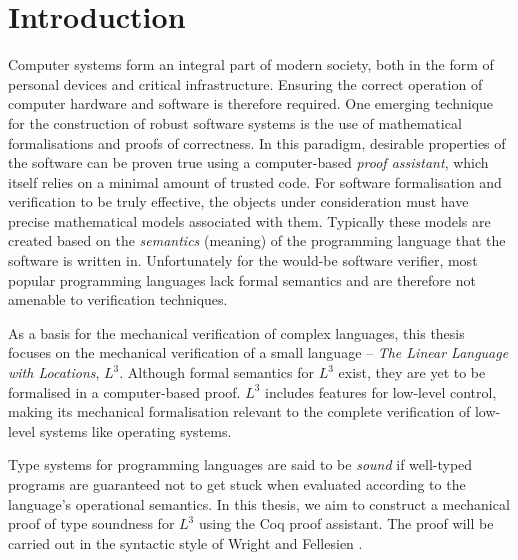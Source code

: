\documentclass[]{unswthesis}
\begin{document}
\frontmatter  
\maketitle

\tableofcontents

\mainmatter

\chapter{Introduction}
\label{ch:intro}

Computer systems form an integral part of modern society, both in the form of personal devices and critical infrastructure. Ensuring the correct operation of computer hardware and software is therefore required. One emerging technique for the construction of robust software systems is the use of mathematical formalisations and proofs of correctness. In this paradigm, desirable properties of the software can be proven true using a computer-based \textit{proof assistant}, which itself relies on a minimal amount of trusted code. For software formalisation and verification to be truly effective, the objects under consideration must have precise mathematical models associated with them. Typically these models are created based on the \textit{semantics} (meaning) of the programming language that the software is written in. Unfortunately for the would-be software verifier, most popular programming languages lack formal semantics and are therefore not amenable to verification techniques.

As a basis for the mechanical verification of complex languages, this thesis focuses on the mechanical verification of a small language -- \textit{The Linear Language with Locations}, $L^3$. Although formal semantics for $L^3$ exist, they are yet to be formalised in a computer-based proof. $L^3$ includes features for low-level control, making its mechanical formalisation relevant to the complete verification of low-level systems like operating systems.

Type systems for programming languages are said to be \textit{sound} if well-typed programs are guaranteed not to get stuck when evaluated according to the language's operational semantics. In this thesis, we aim to construct a mechanical proof of type soundness for $L^3$ using the Coq proof assistant. The proof will be carried out in the syntactic style of Wright and Fellesien \cite{wright94}.
\end{document}

